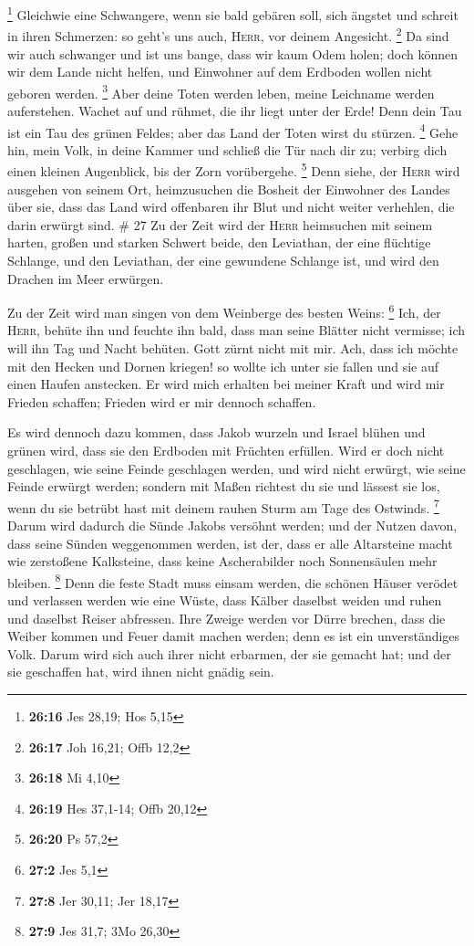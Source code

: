 \footnote{\textbf{26:16} Jes 28,19; Hos 5,15}  Gleichwie
eine Schwangere, wenn sie bald gebären soll, sich ängstet und schreit in
ihren Schmerzen: so geht's uns auch, \textsc{Herr}, vor deinem
Angesicht. \footnote{\textbf{26:17} Joh 16,21; Offb 12,2}
 Da sind wir auch schwanger und ist uns bange, dass wir
kaum Odem holen; doch können wir dem Lande nicht helfen, und Einwohner
auf dem Erdboden wollen nicht geboren werden. \footnote{\textbf{26:18}
  Mi 4,10}  Aber deine Toten werden leben, meine
Leichname werden auferstehen. Wachet auf und rühmet, die ihr liegt unter
der Erde! Denn dein Tau ist ein Tau des grünen Feldes; aber das Land der
Toten wirst du stürzen. \footnote{\textbf{26:19} Hes 37,1-14; Offb 20,12}
 Gehe hin, mein Volk, in deine Kammer und schließ die Tür
nach dir zu; verbirg dich einen kleinen Augenblick, bis der Zorn
vorübergehe. \footnote{\textbf{26:20} Ps 57,2}  Denn
siehe, der \textsc{Herr} wird ausgehen von seinem Ort, heimzusuchen die
Bosheit der Einwohner des Landes über sie, dass das Land wird offenbaren
ihr Blut und nicht weiter verhehlen, die darin erwürgt sind. \# 27
 Zu der Zeit wird der \textsc{Herr} heimsuchen mit seinem
harten, großen und starken Schwert beide, den Leviathan, der eine
flüchtige Schlange, und den Leviathan, der eine gewundene Schlange ist,
und wird den Drachen im Meer erwürgen.

 Zu der Zeit wird man singen von dem Weinberge des besten
Weins: \footnote{\textbf{27:2} Jes 5,1}  Ich, der
\textsc{Herr}, behüte ihn und feuchte ihn bald, dass man seine Blätter
nicht vermisse; ich will ihn Tag und Nacht behüten.  Gott
zürnt nicht mit mir. Ach, dass ich möchte mit den Hecken und Dornen
kriegen! so wollte ich unter sie fallen und sie auf einen Haufen
anstecken.  Er wird mich erhalten bei meiner Kraft und
wird mir Frieden schaffen; Frieden wird er mir dennoch schaffen.

 Es wird dennoch dazu kommen, dass Jakob wurzeln und
Israel blühen und grünen wird, dass sie den Erdboden mit Früchten
erfüllen.  Wird er doch nicht geschlagen, wie seine Feinde
geschlagen werden, und wird nicht erwürgt, wie seine Feinde erwürgt
werden;  sondern mit Maßen richtest du sie und lässest sie
los, wenn du sie betrübt hast mit deinem rauhen Sturm am Tage des
Ostwinds. \footnote{\textbf{27:8} Jer 30,11; Jer 18,17} 
Darum wird dadurch die Sünde Jakobs versöhnt werden; und der Nutzen
davon, dass seine Sünden weggenommen werden, ist der, dass er alle
Altarsteine macht wie zerstoßene Kalksteine, dass keine Ascherabilder
noch Sonnensäulen mehr bleiben. \footnote{\textbf{27:9} Jes 31,7; 3Mo
  26,30}  Denn die feste Stadt muss einsam werden, die
schönen Häuser verödet und verlassen werden wie eine Wüste, dass Kälber
daselbst weiden und ruhen und daselbst Reiser abfressen. 
Ihre Zweige werden vor Dürre brechen, dass die Weiber kommen und Feuer
damit machen werden; denn es ist ein unverständiges Volk. Darum wird
sich auch ihrer nicht erbarmen, der sie gemacht hat; und der sie
geschaffen hat, wird ihnen nicht gnädig sein.

